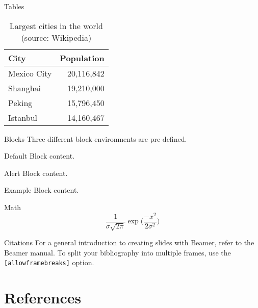 \documentclass[noserifmath,aspectratio=169]{beamer}
\begin{document}
\begin{frame}{Tables}
  \begin{table}
    \caption{Largest cities in the world (source: Wikipedia)}
    \begin{tabular}{@{} lr @{}}
      \toprule
      City & Population\\
      \midrule
      Mexico City & 20,116,842\\
      Shanghai & 19,210,000\\
      Peking & 15,796,450\\
      Istanbul & 14,160,467\\
      \bottomrule
    \end{tabular}
  \end{table}
\end{frame}

\begin{frame}{Blocks}
  	Three different block environments are pre-defined.
    \begin{block}{Default}
        Block content.
    \end{block}

      \begin{alertblock}{Alert}
        Block content.
      \end{alertblock}

      \begin{exampleblock}{Example}
        Block content.
      \end{exampleblock}
\end{frame}

\begin{frame}{Math}
  \begin{equation*}
    \frac{1}{\sigma\sqrt{2\pi}}\exp\biggl(\frac{-x^2}{2\sigma^2}\biggr)
  \end{equation*}
\end{frame}

\begin{frame}[fragile]{Citations}
For a general introduction to creating slides with Beamer, refer to the Beamer manual.\cite{BeamerManual}
To split your bibliography into multiple frames, use the \verb+[allowframebreaks]+ option.
\end{frame}

\makethanks

\section{References}
\begin{frame}[allowframebreaks]
    
	
\end{frame}
\end{document}
